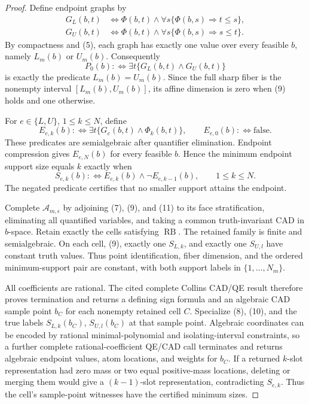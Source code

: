 \documentclass{article}
\begin{document}
\begin{proof}
Define endpoint graphs by
\[
 \begin{split}
 G_L(b,t)&\Longleftrightarrow
 \Phi(b,t)\wedge\forall s\{\Phi(b,s)\Rightarrow t\leq s\},\\
 G_U(b,t)&\Longleftrightarrow
 \Phi(b,t)\wedge\forall s\{\Phi(b,s)\Rightarrow s\leq t\}.
 \end{split}
\tag{8}
\]
By compactness and (5), each graph has exactly one value over every feasible \(b\), namely \(L_m(b)\) or \(U_m(b)\).  Consequently
\[
 P_0(b):\Longleftrightarrow\exists t\{G_L(b,t)\wedge G_U(b,t)\}
\tag{9}
\]
is exactly the predicate \(L_m(b)=U_m(b)\).  Since the full sharp fiber is the nonempty interval \([L_m(b),U_m(b)]\), its affine dimension is zero when (9) holds and one otherwise.

For \(e\in\{L,U\}\), \(1\leq k\leq N\), define
\[
 E_{e,k}(b):\Longleftrightarrow
 \exists t\{G_e(b,t)\wedge\Phi_k(b,t)\},
 \qquad E_{e,0}(b):\Longleftrightarrow\mathrm{false}.
\tag{10}
\]
These predicates are semialgebraic after quantifier elimination.  Endpoint compression gives \(E_{e,N}(b)\) for every feasible \(b\).  Hence the minimum endpoint support size equals \(k\) exactly when
\[
 S_{e,k}(b):\Longleftrightarrow E_{e,k}(b)\wedge\neg E_{e,k-1}(b),
 \qquad 1\leq k\leq N.
\tag{11}
\]
The negated predicate certifies that no smaller support attains the endpoint.

Complete \(\mathcal A_{m,\epsilon}\) by adjoining (7), (9), and (11) to its face stratification, eliminating all quantified variables, and taking a common truth-invariant CAD in \(b\)-space.  Retain exactly the cells satisfying \(\operatorname{RB}\).  The retained family is finite and semialgebraic.  On each cell, (9), exactly one \(S_{L,k}\), and exactly one \(S_{U,l}\) have constant truth values.  Thus point identification, fiber dimension, and the ordered minimum-support pair are constant, with both support labels in \(\{1,\ldots,N_m\}\).

All coefficients are rational.  The cited complete Collins CAD/QE result therefore proves termination and returns a defining sign formula and an algebraic CAD sample point \(b_C\) for each nonempty retained cell \(C\).  Specialize (8), (10), and the true labels \(S_{L,k}(b_C)\), \(S_{U,l}(b_C)\) at that sample point.  Algebraic coordinates can be encoded by rational minimal-polynomial and isolating-interval constraints, so a further complete rational-coefficient QE/CAD call terminates and returns algebraic endpoint values, atom locations, and weights for \(b_C\).  If a returned \(k\)-slot representation had zero mass or two equal positive-mass locations, deleting or merging them would give a \((k-1)\)-slot representation, contradicting \(S_{e,k}\).  Thus the cell's sample-point witnesses have the certified minimum sizes.


\end{proof}
\end{document}
